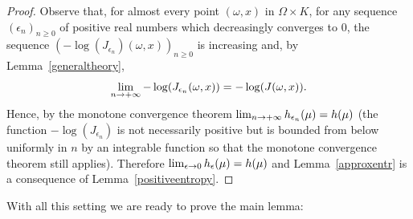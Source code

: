 \documentclass[10pt]{amsart}
\theoremstyle{definition}\newtheorem{defi}[theo]{Definition}\newtheorem{rema}[theo]{Remark}\newtheorem{exam}[theo]{Example}\newtheorem{exem}[theo]{Example}\newtheorem{nota}[theo]{Notation}
\renewcommand*{\to}{\mathchoice{\longrightarrow}{\rightarrow}{\rightarrow}{\rightarrow}}
\begin{document}
\begin{proof}
Observe that, for almost every point $(\omega,x)$ in $\Omega \times K$, for any sequence $(\epsilon_{n})_{n \geq 0}$ of positive real numbers which decreasingly converges to $0$, the sequence $(-\log(J_{\epsilon_{n}})(\omega,x))_{n \geq 0}$ is increasing and, by Lemma~\ref{generaltheory},
\[
\lim_{n \to + \infty} -\log(J_{\epsilon_{n}}(\omega,x))=- \log(J(\omega,x)).
\]
Hence, by the monotone convergence theorem $\lim_{n \to + \infty} h_{\epsilon_{n}}(\mu)=h(\mu)$ (the function $-\log(J_{\epsilon_{n}})$ is not necessarily positive but is bounded from below uniformly in $n$ by an integrable function so that the monotone convergence theorem still applies). Therefore $\lim_{\epsilon \to 0} h_{\epsilon}(\mu)=h(\mu)$ and Lemma~\ref{approxentr} is a consequence of Lemma~\ref{positiveentropy}.
\end{proof}

With all this setting we are ready to prove the main lemma:
\end{document}
